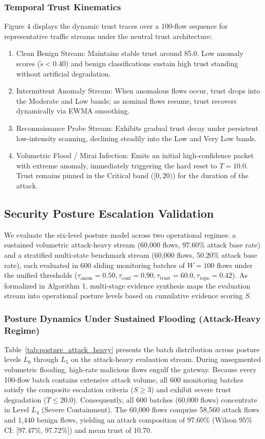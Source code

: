 \documentclass[journal,10pt,onecolumn]{IEEEtran}
\begin{document}
\subsubsection{Temporal Trust Kinematics}
Figure 4 displays the dynamic trust traces over a 100-flow sequence for representative traffic streams under the neutral trust architecture:
\begin{enumerate}
  \item Clean Benign Stream: Maintains stable trust around 85.0. Low anomaly scores ($\tilde{s} < 0.40$) and benign classifications sustain high trust standing without artificial degradation.
  \item Intermittent Anomaly Stream: When anomalous flows occur, trust drops into the Moderate and Low bands; as nominal flows resume, trust recovers dynamically via EWMA smoothing.
  \item Reconnaissance Probe Stream: Exhibits gradual trust decay under persistent low-intensity scanning, declining steadily into the Low and Very Low bands.
  \item Volumetric Flood / Mirai Infection: Emits an initial high-confidence packet with extreme anomaly, immediately triggering the hard reset to $T = 10.0$. Trust remains pinned in the Critical band ($[0, 20)$) for the duration of the attack.
\end{enumerate}

\subsection{Security Posture Escalation Validation}
We evaluate the six-level posture model across two operational regimes: a sustained volumetric attack-heavy stream (60,000 flows, 97.60\% attack base rate) and a stratified multi-state benchmark stream (60,000 flows, 50.20\% attack base rate), each evaluated in 600 sliding monitoring batches of $W = 100$ flows under the unified thresholds ($\tau_{\text{anom}} = 0.50, \tau_{\text{conf}} = 0.90, \tau_{\text{trust}} = 60.0, \tau_{\text{topo}} = 0.42$). As formalized in Algorithm 1, multi-stage evidence synthesis maps the evaluation stream into operational posture levels based on cumulative evidence scoring $S$.

\subsubsection{Posture Dynamics Under Sustained Flooding (Attack-Heavy Regime)}
Table~\ref{tab:posture_attack_heavy} presents the batch distribution across posture levels $L_0$ through $L_5$ on the attack-heavy evaluation stream. During unsegmented volumetric flooding, high-rate malicious flows engulf the gateway. Because every 100-flow batch contains extensive attack volume, all 600 monitoring batches satisfy the composite escalation criteria ($S \ge 3$) and exhibit severe trust degradation ($T \le 20.0$). Consequently, all 600 batches (60,000 flows) concentrate in Level $L_4$ (Severe Containment). The 60,000 flows comprise 58,560 attack flows and 1,440 benign flows, yielding an attack composition of 97.60\% (Wilson 95\% CI: [97.47\%, 97.72\%]) and mean trust of 10.70.
\end{document}
